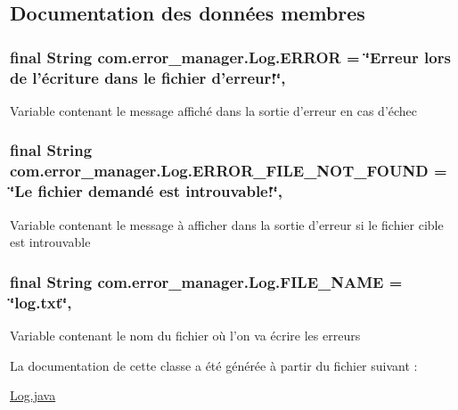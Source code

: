 \subsection{Documentation des données membres}
\hypertarget{classcom_1_1error__manager_1_1Log_ab7a0b23daad7f39e20de0dac67011b82}{
\subsubsection[{E\-R\-R\-O\-R}]{\setlength{\rightskip}{0pt plus 5cm}final String com.\-error\-\_\-manager.\-Log.\-E\-R\-R\-O\-R = \char`\"{}Erreur lors de l'écriture dans le fichier d'erreur!\char`\"{}\hspace{0.3cm}{\ttfamily [static]}, {\ttfamily [private]}}}\label{classcom_1_1error__manager_1_1Log_ab7a0b23daad7f39e20de0dac67011b82}
Variable contenant le message affiché dans la sortie d'erreur en cas d'échec \hypertarget{classcom_1_1error__manager_1_1Log_a2b163327c26f9f62da88ef109f0300c3}{
\subsubsection[{E\-R\-R\-O\-R\-\_\-\-F\-I\-L\-E\-\_\-\-N\-O\-T\-\_\-\-F\-O\-U\-N\-D}]{\setlength{\rightskip}{0pt plus 5cm}final String com.\-error\-\_\-manager.\-Log.\-E\-R\-R\-O\-R\-\_\-\-F\-I\-L\-E\-\_\-\-N\-O\-T\-\_\-\-F\-O\-U\-N\-D = \char`\"{}Le fichier demandé est introuvable!\char`\"{}\hspace{0.3cm}{\ttfamily [static]}, {\ttfamily [private]}}}\label{classcom_1_1error__manager_1_1Log_a2b163327c26f9f62da88ef109f0300c3}
Variable contenant le message à afficher dans la sortie d'erreur si le fichier cible est introuvable \hypertarget{classcom_1_1error__manager_1_1Log_a473629efcbd7c2b85456b8e80ab46cd3}{
\subsubsection[{F\-I\-L\-E\-\_\-\-N\-A\-M\-E}]{\setlength{\rightskip}{0pt plus 5cm}final String com.\-error\-\_\-manager.\-Log.\-F\-I\-L\-E\-\_\-\-N\-A\-M\-E = \char`\"{}log.\-txt\char`\"{}\hspace{0.3cm}{\ttfamily [static]}, {\ttfamily [private]}}}\label{classcom_1_1error__manager_1_1Log_a473629efcbd7c2b85456b8e80ab46cd3}
Variable contenant le nom du fichier où l'on va écrire les erreurs 

La documentation de cette classe a été générée à partir du fichier suivant \-:\begin{DoxyCompactItemize}
\item 
\hyperlink{Log_8java}{Log.\-java}\end{DoxyCompactItemize}
